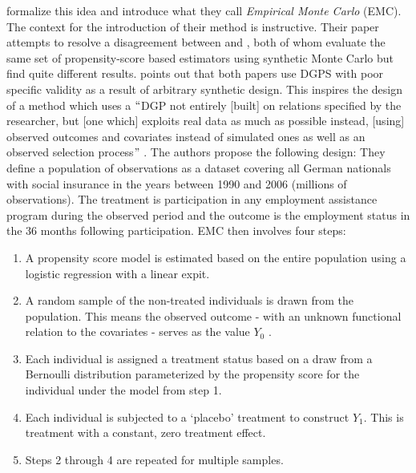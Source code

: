\documentclass[../main.tex]{subfiles}
\begin{document}
\vspace{\baselineskip}
\cite{Huber2013TheScore} formalize this idea and introduce what they call \textit{Empirical Monte Carlo }(EMC). The context for the introduction of their method is instructive. Their paper attempts to resolve a disagreement between \cite{Frolich2004Finite-sampleEstimators} and \cite{Busso2014NEWESTIMATORS}, both of whom evaluate the same set of propensity-score based estimators using synthetic Monte Carlo but find quite different results. \cite{Huber2013TheScore} points out that both papers use DGPS with poor specific validity as a result of arbitrary synthetic design. This inspires the design of a method which uses a $``$DGP not entirely [built] on relations specified by the researcher, but [one which] exploits real data as much as possible instead, [using] observed outcomes and covariates instead of simulated ones as well as an observed selection process$"$ . The authors propose the following design: They define a population of observations as a dataset covering all German nationals with social insurance in the years between 1990 and 2006 (millions of observations). The treatment is participation in any employment assistance program during the observed period and the outcome is the employment status in the 36 months following participation. EMC then involves four steps: \par


\vspace{\baselineskip}
\begin{enumerate}
	\item A propensity score model is estimated based on the entire population using a logistic regression with a linear expit.\par

	\item A random sample of the non-treated individuals is drawn from the population. This means the observed outcome - with an unknown functional relation to the covariates - serves as the value  \( Y_{0} \) .\par

	\item Each individual is assigned a treatment status based on a draw from a Bernoulli distribution parameterized by the propensity score for the individual under the model from step 1.\par

	\item Each individual is subjected to a ‘placebo’ treatment to construct  \( Y_{1}. \) This is treatment with a constant, zero treatment effect.\par

	\item Steps 2 through 4 are repeated for multiple samples.
\end{enumerate}\par
\end{document}
